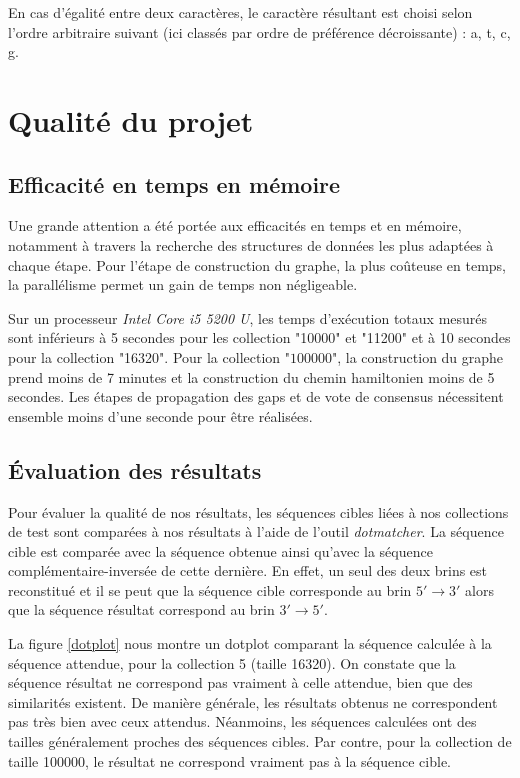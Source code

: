 \documentclass{article}
\begin{document}
En cas d'égalité entre deux caractères, le caractère résultant est choisi selon l'ordre arbitraire suivant (ici classés par ordre de préférence décroissante) : a, t, c, g.

\section{Qualité du projet}

\subsection{Efficacité en temps en mémoire}

Une grande attention a été portée aux efficacités en temps et en mémoire, notamment à travers la recherche des structures de données les plus adaptées à chaque étape. Pour l'étape de construction du graphe, la plus coûteuse en temps, la parallélisme permet un gain de temps non négligeable.

Sur un processeur \textit{Intel Core i5 5200 U}, les temps d'exécution totaux mesurés sont inférieurs à 5 secondes pour les collection "10000" et "11200" et à 10 secondes pour la collection "16320". Pour la collection "$100000$", la construction du graphe prend moins de 7 minutes et la construction du chemin hamiltonien moins de 5 secondes. Les étapes de propagation des gaps et de vote de consensus nécessitent ensemble moins d'une seconde pour être réalisées.

\subsection{\'Evaluation des résultats}

Pour évaluer la qualité de nos résultats, les séquences cibles liées à nos collections de test sont comparées à nos résultats à l'aide de l'outil \textit{dotmatcher}. La séquence cible est comparée avec la séquence obtenue ainsi qu'avec la séquence complémentaire-inversée de cette dernière. En effet, un seul des deux brins est reconstitué et il se peut que la séquence cible corresponde au brin $5' \to 3'$ alors que la séquence résultat correspond au brin $3' \to 5'$.

La figure \ref{dotplot} nous montre un dotplot comparant la séquence calculée à la séquence attendue, pour la collection 5 (taille 16320). On constate que la séquence résultat ne correspond pas vraiment à celle attendue, bien que des similarités existent. De manière générale, les résultats obtenus ne correspondent pas très bien avec ceux attendus. Néanmoins, les séquences calculées ont des tailles généralement proches des séquences cibles. Par contre, pour la collection de taille 100000, le résultat ne correspond vraiment pas à la séquence cible.
\end{document}
